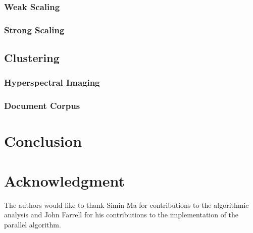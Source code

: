 \documentclass[conference,compsoc]{IEEEtran}
\begin{document}
\subsubsection{Weak Scaling}

\subsubsection{Strong Scaling}

\subsection{Clustering}

\subsubsection{Hyperspectral Imaging}

\subsubsection{Document Corpus}

\section{Conclusion}

\section*{Acknowledgment}

The authors would like to thank Simin Ma for contributions to the algorithmic analysis and John Farrell for his contributions to the implementation of the parallel algorithm.



\end{document}
